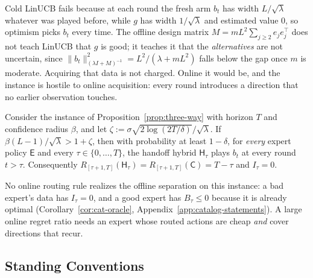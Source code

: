 \documentclass[anon]{alt2027} %
\newcommand{\Cold}{\mathsf{C}}
\newcommand{\Exp}{\mathsf{E}}
\newcommand{\Hyb}{\mathsf{H}}
\begin{document}
Cold LinUCB fails because at each round the fresh arm $b_t$ has width
$L/\sqrt\lambda$ whatever was played before, while $g$ has width
$1/\sqrt\lambda$ and estimated value $0$, so optimism picks $b_t$ every time.
The offline design matrix $M=mL^2\sum_{j\ge2}e_je_j^\top$ does not teach
LinUCB that $g$ is good; it teaches it that the \emph{alternatives} are not
uncertain, since $\|b_t\|^2_{(\lambda I+M)^{-1}}=L^2/(\lambda+mL^2)$ falls
below the gap once $m$ is moderate. Acquiring that data is not charged.
Online it would be, and the instance is hostile to online acquisition: every
round introduces a direction that no earlier observation touches.

\begin{proposition}
\label{prop:one-pass}
Consider the instance of Proposition~\ref{prop:three-way} with horizon $T$
and confidence radius $\beta$, and let $\zeta:=\sigma\sqrt{2\log(2T/\delta)}/\sqrt\lambda$.
If $\beta(L-1)/\sqrt\lambda>1+\zeta$, then with probability at least
$1-\delta$, for \emph{every} expert policy $\Exp$ and every $\tau\in\{0,\dots,T\}$,
the handoff hybrid $\Hyb_\tau$ plays $b_t$ at every round $t>\tau$. Consequently
$R_{[\tau+1,T]}(\Hyb_\tau)=R_{[\tau+1,T]}(\Cold)=T-\tau$ and $I_\tau=0$.
\end{proposition}

No online routing rule realizes the offline separation on this instance: a bad
expert's data has $I_\tau=0$, and a good expert has $B_\tau\le0$ because it is
already optimal (Corollary~\ref{cor:cat-oracle},
Appendix~\ref{app:catalog-statements}). A large online regret ratio needs an expert
whose routed actions are cheap \emph{and} cover directions that recur.


\subsection{Standing Conventions}
\label{sec:template}
\end{document}

